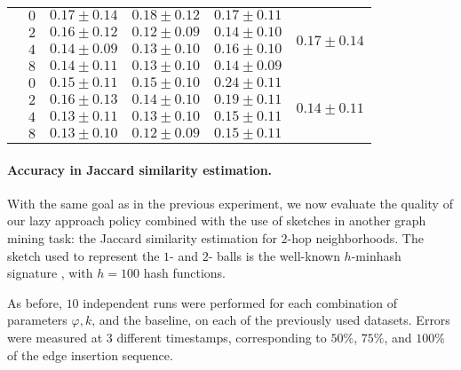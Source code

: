 \begin{table}[ht]
\begin{tabular}{lc|ccc|c}
        \midrule[.66pt]

        \parbox[t]{2mm}{}

        & $0$ & $0.17 \pm 0.14$ & $0.18 \pm 0.12$ & $0.17 \pm 0.11$ &  \\
        & $2$ & $0.16 \pm 0.12$ & $0.12 \pm 0.09$ & $0.14 \pm 0.10$ & \\
        & $4$ & $0.14 \pm 0.09$ & $0.13 \pm 0.10$ & $0.16 \pm 0.10$ & \\
        & $8$ & $0.14 \pm 0.11$ & $0.13 \pm 0.10$ & $0.14 \pm 0.09$ & \\

        \midrule[.66pt]

        \parbox[t]{2mm}{}

        & $0$ & $0.15 \pm 0.11$ & $0.15 \pm 0.10$ & $0.24 \pm 0.11$ &  \\
        & $2$ & $0.16 \pm 0.13$ & $0.14 \pm 0.10$ & $0.19 \pm 0.11$ & \\
        & $4$ & $0.13 \pm 0.11$ & $0.13 \pm 0.10$ & $0.15 \pm 0.11$ & \\
        & $8$ & $0.13 \pm 0.10$ & $0.12 \pm 0.09$ & $0.15 \pm 0.11$ & \\
        
    \bottomrule

    \end{tabular}
    \label{tab:size-quality}
\end{table}

\paragraph{Accuracy in Jaccard similarity estimation.} 
With the same goal as in the previous experiment, we now evaluate the quality of our lazy approach policy combined with the use of sketches in another graph mining task: the Jaccard similarity estimation for $2$-hop neighborhoods.
The sketch used to represent the $1$- and $2$- balls is the well-known $h$-minhash signature \cite{broder1997resemblance}, with $h = 100$ hash functions.

As before, $10$ independent runs were performed for each combination of parameters $\varphi, k$, and the baseline, on each of the previously used datasets.
Errors were measured at $3$ different timestamps, corresponding to $50\%$, $75\%$, and $100\%$ of the edge insertion sequence.

